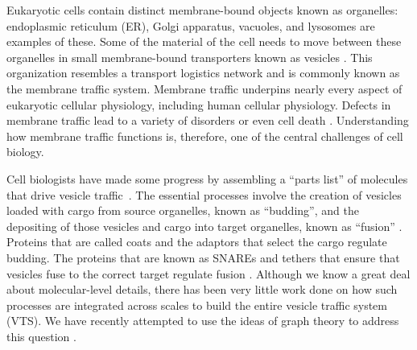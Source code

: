 \noindent 
Eukaryotic cells contain distinct membrane-bound objects known as organelles: endoplasmic reticulum (ER), Golgi apparatus, vacuoles, and lysosomes are examples of these.
%
%
%
%
%
%
Some of the material of the cell needs to move
between these organelles in small membrane-bound
transporters known as vesicles \cite{stenmark2009rab}.
%
This organization resembles a transport logistics network
and is commonly known as the membrane traffic system.
%
Membrane traffic underpins nearly every aspect of eukaryotic cellular
physiology, including human cellular physiology.
%
Defects in membrane traffic lead to a variety of disorders or even
cell death \cite{stenmark2009rab}.
%
Understanding how membrane traffic functions is, therefore, one of the
central challenges of cell biology.
%

Cell biologists have made some progress by assembling a
“parts list” of molecules that drive vesicle
traffic~\cite{dacks2007evolution}.
%
The essential processes involve the creation of vesicles loaded with
cargo from source organelles, known as “budding”, and the depositing
of those vesicles and cargo into target organelles, known as “fusion”
\cite{munro2004organelle}.
%
Proteins that are called coats and the adaptors that select the cargo regulate budding.
%
The proteins that are known as SNAREs and tethers that ensure that vesicles
fuse to the correct target regulate fusion
\cite{mani2016stacking}.
%
Although we know a great deal about molecular-level details, there has
been very little work done on how such processes are integrated across
scales to build the entire vesicle traffic system (VTS).
%
We have recently attempted to use the ideas of graph theory to address
this question \cite{mani2016stacking,shukla2017discovering}.

